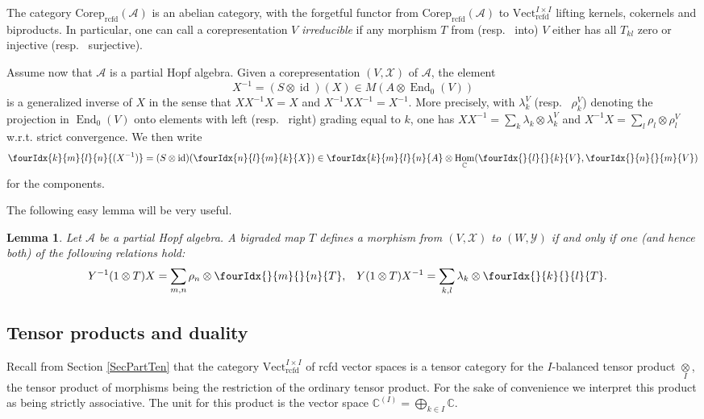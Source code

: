 \documentclass[10pt]{article}
\DeclareMathOperator{\End}{\mathrm{End}}
\DeclareMathOperator{\id}{id}
\DeclareMathOperator{\Hom}{Hom}
\DeclareMathOperator{\rcf}{\mathrm{rcfd}}
\newcommand{\Corep}{\mathrm{Corep}}
\newcommand{\C}{\mathbb{C}}
\newcommand{\Vectrcf}{\mathrm{Vect}^{I\times I}_{\rcf}}
\newcommand{\itimes}{\underset{I}{\otimes}}
\newcommand{\Gr}[5]{\fourIdx{#2}{#4}{#3}{#5}{#1}}%
\newcommand{\Gru}[3]{\Gr{#1}{}{}{#2}{#3}}
\newtheorem{Lem}[Theorem]{Lemma}
\theoremstyle{definition}
\numberwithin{equation}{section}
\begin{document}
The category $\Corep_{\rcf}(\mathscr{A})$ is an abelian category, with the forgetful functor from $\Corep_{\rcf}(\mathscr{A})$ to $\Vectrcf$  lifting kernels, cokernels and biproducts. In particular, one can call a corepresentation $V$ \emph{irreducible} if any morphism $T$ from (resp.~ into) $V$ either has all $T_{kl}$ zero or injective (resp.~ surjective).

Assume now that $\mathscr{A}$ is a partial Hopf algebra. Given a corepresentation $(V,\mathscr{X})$ of $\mathscr{A}$, the element \[X^{-1} =  (S \otimes \id)(X) \in M(A \otimes \End_{0}(V))\] is a generalized inverse of $X$ in the sense that $XX^{-1}X=X$ and $X^{-1}XX^{-1}=X^{-1}$. More precisely, with $\lambda_k^V$ (resp.~ $\rho_k^V$) denoting the projection in $\End_0(V)$ onto elements with left (resp.~ right) grading equal to $k$, one has $XX^{-1} = \sum_{k} \lambda_{k} \otimes \lambda^{V}_{k}$ and
    $X^{-1}X  = \sum_{l} \rho_{l} \otimes \rho^{V}_{l}$ w.r.t. strict convergence. We then write
   \[\Gr{(X^{-1})}{k}{l}{m}{n}=(S \otimes \id)(\Gr{X}{n}{m}{l}{k}) \in
   \Gr{A}{k}{l}{m}{n} \otimes \Hom_{\C}(\Gru{V}{l}{k},\Gru{V}{n}{m})\] for the components.

The following easy lemma will be very useful.
\begin{Lem} \label{lemma:rep-total-morphism}
 Let $\mathscr{A}$ be a partial Hopf algebra. A bigraded map $T$ defines a morphism from 
    $(V,\mathscr{X})$ to $(W,\mathscr{Y})$ if and only if one (and hence both) of the following relations hold:
    \begin{align*}
      Y^{-1}(1 \otimes T)X&=\sum_{m,n} \rho_{n} \otimes \Gru{T}{m}{n},
      &
    Y(1\otimes T)X^{-1} &=\sum_{k,l} \lambda_{k} \otimes \Gru{T}{k}{l}.
    \end{align*}
\end{Lem}


\subsection{Tensor products and duality}

Recall from Section \ref{SecPartTen} that the category $\Vectrcf$ of rcfd vector spaces is a tensor category for the $I$-balanced tensor product $\itimes$, the tensor product of morphisms being the restriction of the ordinary tensor product. For the sake of convenience we interpret this product as being strictly associative.  The unit for this product is the vector space $\C^{(I)}=\bigoplus_{k\in I} \C$. 
\end{document}
